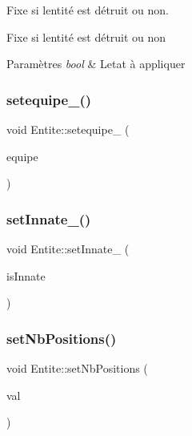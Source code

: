Fixe si l\textquotesingle{}entité est détruit ou non. 

Fixe si l\textquotesingle{}entité est détruit ou non 
\begin{DoxyParams}{Paramètres}
{\em bool} & L\textquotesingle{}etat à appliquer \\
\hline
\end{DoxyParams}
\mbox{\label{class_entite_ac5e59154ac3eb3f131d9ed7f2c84d7a8}} 
\subsubsection{\texorpdfstring{setequipe\+\_\+()}{setequipe\_()}}
{\footnotesize\ttfamily void Entite\+::setequipe\+\_\+ (\begin{DoxyParamCaption}\item[{\hyperlink{constantes_8h_a08fa5554288d5031a8f3bb83cc04ee83}{Equipe}}]{equipe }\end{DoxyParamCaption})\hspace{0.3cm}{\ttfamily [inline]}}

\mbox{\label{class_entite_a74619d348057955b7272442222b63108}} 
\subsubsection{\texorpdfstring{set\+Innate\+\_\+()}{setInnate\_()}}
{\footnotesize\ttfamily void Entite\+::set\+Innate\+\_\+ (\begin{DoxyParamCaption}\item[{bool}]{is\+Innate }\end{DoxyParamCaption})\hspace{0.3cm}{\ttfamily [inline]}}

\mbox{\label{class_entite_a5a44c467ca2c779f056767a7a4e00b42}} 
\subsubsection{\texorpdfstring{set\+Nb\+Positions()}{setNbPositions()}}
{\footnotesize\ttfamily void Entite\+::set\+Nb\+Positions (\begin{DoxyParamCaption}\item[{int}]{val }\end{DoxyParamCaption})}

